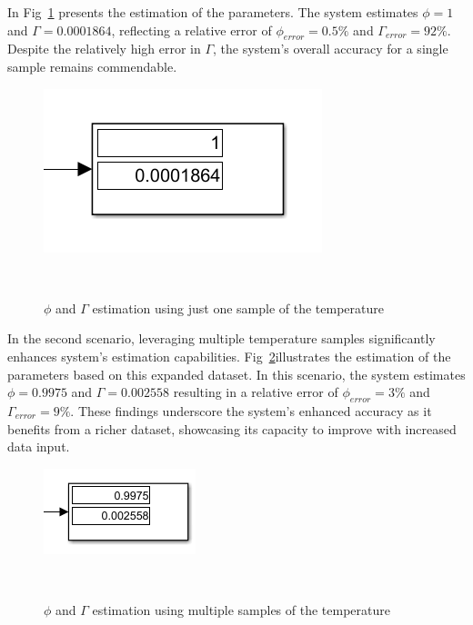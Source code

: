 In Fig~\ref{fig:simulink_params} presents the estimation of the parameters. The system estimates $\phi = 1$ and $\Gamma = 0.0001864$, reflecting a relative error of $\phi_{error} = 0.5\%$ and $\Gamma_{error} = 92\%$. Despite the relatively high error in $\Gamma$, the system's overall accuracy for a single sample remains commendable.

\begin{figure}[H]
\centering
\includegraphics[width=0.55\linewidth]{figures/simulink_params.png}
\caption{$\phi$ and $\Gamma$ estimation using just one sample of the temperature}
~\label{fig:simulink_params}
\end{figure}

In the second scenario, leveraging multiple temperature samples significantly enhances system's estimation capabilities. Fig~\ref{fig:simulink_params_gen}illustrates the estimation of the parameters based on this expanded dataset. In this scenario, the system estimates $\phi = 0.9975$ and $\Gamma = 0.002558$ resulting in a relative error of $\phi_{error} = 3\%$ and $\Gamma_{error} = 9\%$. These findings underscore the system's enhanced accuracy as it benefits from a richer dataset, showcasing its capacity to improve with increased data input.

\begin{figure}[H]
\centering
\includegraphics[width=0.4\linewidth]{figures/simulink_params_gen.png}
\caption{$\phi$ and $\Gamma$ estimation using multiple samples of the temperature}
~\label{fig:simulink_params_gen}
\end{figure}
